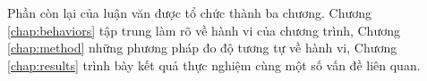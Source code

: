 Phần còn lại của luận văn được tổ chức thành ba chương. Chương \ref{chap:behaviors}
tập trung làm rõ về hành vi của chương trình, Chương \ref{chap:method} những phương
pháp đo độ tương tự về hành vi, Chương \ref{chap:results} trình bày
kết quả thực nghiệm cùng một số vấn đề liên quan.





